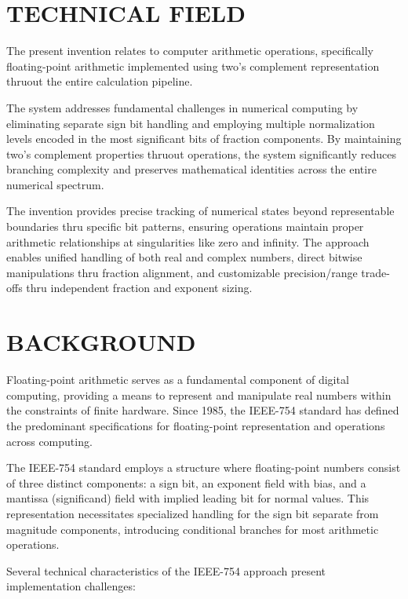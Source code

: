 \documentclass[12pt,letter]{article}
\begin{document}
\newpage
\section{TECHNICAL FIELD}

The present invention relates to computer arithmetic operations, specifically floating-point arithmetic implemented using two's complement representation thruout the entire calculation pipeline.

The system addresses fundamental challenges in numerical computing by eliminating separate sign bit handling and employing multiple normalization levels encoded in the most significant bits of fraction components. By maintaining two's complement properties thruout operations, the system significantly reduces branching complexity and preserves mathematical identities across the entire numerical spectrum.

The invention provides precise tracking of numerical states beyond representable boundaries thru specific bit patterns, ensuring operations maintain proper arithmetic relationships at singularities like zero and infinity. The approach enables unified handling of both real and complex numbers, direct bitwise manipulations thru fraction alignment, and customizable precision/range trade-offs thru independent fraction and exponent sizing.

\newpage

\section{BACKGROUND}

Floating-point arithmetic serves as a fundamental component of digital computing, providing a means to represent and manipulate real numbers within the constraints of finite hardware. Since 1985, the IEEE-754 standard has defined the predominant specifications for floating-point representation and operations across computing.

The IEEE-754 standard employs a structure where floating-point numbers consist of three distinct components: a sign bit, an exponent field with bias, and a mantissa (significand) field with implied leading bit for normal values. This representation necessitates specialized handling for the sign bit separate from magnitude components, introducing conditional branches for most arithmetic operations.

Several technical characteristics of the IEEE-754 approach present implementation challenges:
\end{document}
